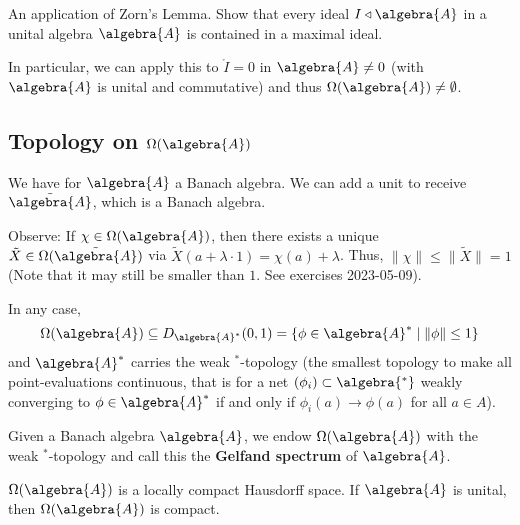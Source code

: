 \documentclass[a4paper]{article}
\begin{document}
\begin{exercise}
	An application of Zorn's Lemma. Show that every ideal $I \triangleleft \algebra{A}$ in a unital algebra $\algebra{A}$ is contained in a maximal ideal.
\end{exercise}

In particular, we can apply this to $\ring{I} = 0$ in $\algebra{A} \neq 0$ (with $\algebra{A}$ is unital and commutative) and thus $\Omega(\algebra{A}) \neq \emptyset$.

\subsection*{Topology on $\Omega(\algebra{A})$}

We have for $\algebra{A}$ a Banach algebra. We can add a unit to receive $\tilde{\algebra{A}}$, which is a Banach algebra.

Observe: If $\chi \in \Omega(\algebra{A})$, then there exists a unique $\tilde{X} \in \Omega(\tilde{\algebra{A}})$ via $\tilde{X}(a + \lambda \cdot 1) = \chi(a) + \lambda$. Thus, $\|\chi\| \leq \|\tilde{X}\| = 1$ (Note that it may still be smaller than $1$. See exercises 2023-05-09).

In any case,
\begin{equation*}
	\Omega(\algebra{A}) \subseteq D_{\algebra{A}^*}(0,1) = \{ \phi \in \algebra{A}^* \mid \| \phi \| \leq 1 \}
\end{equation*}
and $\algebra{A}^*$ carries the weak $^*$-topology (the smallest topology to make all point-evaluations continuous, that is for a net $(\phi_i)  \subset \algebra{^*}$ weakly converging to $\phi \in \algebra{A}^*$ if and only if $\phi_i(a) \to \phi(a)$ for all $a \in A$).

\begin{definition}
	Given a Banach algebra $\algebra{A}$, we endow $\Omega(\algebra{A})$ with the weak $^*$-topology and call this the \textbf{Gelfand spectrum} of $\algebra{A}$.
\end{definition}

\begin{proposition}
	$\Omega(\algebra{A})$ is a locally compact Hausdorff space. If $\algebra{A}$ is unital, then $\Omega(\algebra{A})$ is compact.
\end{proposition}
\end{document}
